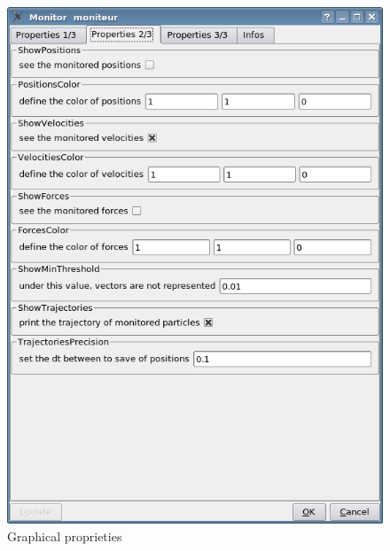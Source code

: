 \documentclass[a4paper,10pt]{article}
\begin{document}
\begin{enumerate}
\begin{figure} [h]
	\includegraphics[scale=0.5] {QTableMonitor2.png}
	\caption{Graphical proprieties}
	\label{figure2}
\end{figure}







\end{enumerate}
\end{document}
